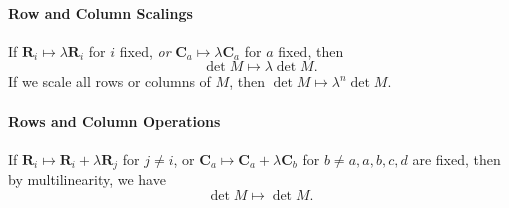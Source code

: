 \documentclass[a4paper]{article}
\begin{document}
    \paragraph{Row and Column Scalings}
    If $ \mathbf{R}_i \mapsto \lambda\mathbf{R}_i $ for $i$ fixed,
    \textit{or} $ \mathbf{C}_a\mapsto \lambda\mathbf{C}_a $ for $a$ fixed, then
    \[
      \det M \mapsto \lambda \det M
    .\]
    If we scale all rows or columns of $M$, then $ \det M \mapsto
    \lambda^n \det M  $.
    \paragraph{Rows and Column Operations}
    If $ \mathbf{R}_i\mapsto\mathbf{R}_i+\lambda\mathbf{R}_j $ for
    $j\neq i$, or $
    \mathbf{C}_a\mapsto\mathbf{C}_a+\lambda\mathbf{C}_b $ for $ b\neq
    a, a,b,c,d $ are fixed, then by multilinearity, we have
    \[
      \det M \mapsto \det M
    .\]
\end{document}
